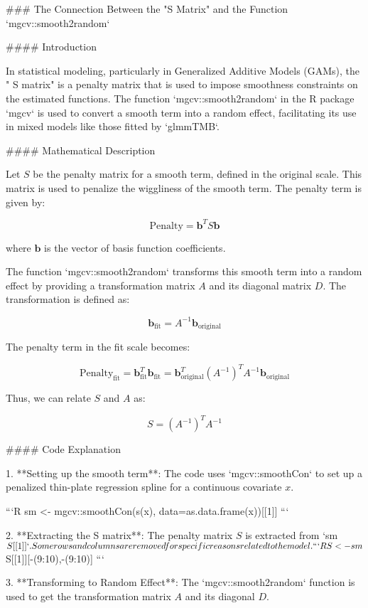 ### The Connection Between the "S Matrix" and the Function `mgcv::smooth2random`

#### Introduction

In statistical modeling, particularly in Generalized Additive Models (GAMs), the "  S matrix" is a penalty matrix that is used to impose smoothness constraints on the estimated functions. The function `mgcv::smooth2random` in the R package `mgcv` is used to convert a smooth term into a random effect, facilitating its use in mixed models like those fitted by `glmmTMB`.

#### Mathematical Description

Let \( S \) be the penalty matrix for a smooth term, defined in the original scale. This matrix is used to penalize the wiggliness of the smooth term. The penalty term is given by:

\[
\text{Penalty} = \mathbf{b}^T S \mathbf{b}
\]

where \( \mathbf{b} \) is the vector of basis function coefficients.

The function `mgcv::smooth2random` transforms this smooth term into a random effect by providing a transformation matrix \( A \) and its diagonal matrix \( D \). The transformation is defined as:

\[
\mathbf{b}_{\text{fit}} = A^{-1} \mathbf{b}_{\text{original}}
\]

The penalty term in the fit scale becomes:

\[
\text{Penalty}_{\text{fit}} = \mathbf{b}_{\text{fit}}^T \mathbf{b}_{\text{fit}} = \mathbf{b}_{\text{original}}^T (A^{-1})^T A^{-1} \mathbf{b}_{\text{original}}
\]

Thus, we can relate \( S \) and \( A \) as:

\[
S = (A^{-1})^T A^{-1}
\]

#### Code Explanation

1. **Setting up the smooth term**: The code uses `mgcv::smoothCon` to set up a penalized thin-plate regression spline for a continuous covariate \( x \).

    ```R
    sm <- mgcv::smoothCon(s(x), data=as.data.frame(x))[[1]]
    ```

2. **Extracting the S matrix**: The penalty matrix \( S \) is extracted from `sm$S[[1]]`. Some rows and columns are removed for specific reasons related to the model.

    ```R
    S <- sm$S[[1]][-(9:10),-(9:10)]
    ```

3. **Transforming to Random Effect**: The `mgcv::smooth2random` function is used to get the transformation matrix \( A \) and its diagonal \( D \).

